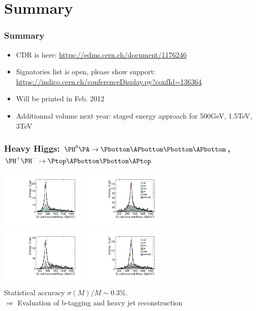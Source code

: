 \documentclass{beamer}
\begin{document}
\section{Summary}
\begin{frame}
\frametitle{Summary}
\begin{itemize}
  \item CDR is here:  \url{https://edms.cern.ch/document/1176246}
  \item Signatories list is open, please show support:
  \url{https://indico.cern.ch/conferenceDisplay.py?confId=136364}
  \item Will be printed in Feb. 2012
  \item Additionnal volume next year: staged energy approach for 500GeV, 1.5TeV, 3TeV
\end{itemize}
\end{frame}

\appendix


\begin{frame}
\frametitle{Heavy Higgs: $\PH^0\PA\to\Pbottom\APbottom\Pbottom\APbottom$,
$\PH^+\PH^-\to\Ptop\APbottom\Pbottom\APtop$}
\centering
\includegraphics[width=4cm]{HAMass742_Bkg_CKFM_00BX_FJ.pdf}
\includegraphics[width=4cm]{HAMass902_Bkg_CKFM_00BX_FJ.pdf}\\
\includegraphics[width=4cm]{Hpm_Mass742_Bkg_CKFM_00BX_FJ.pdf}
\includegraphics[width=4cm]{Hpm_Mass902_Bkg_CKFM_00BX_FJ.pdf}\\
{\scriptsize Statistical accuracy $\sigma(M)/M \sim0.3\%$.}\\
$\Rightarrow$ Evaluation of b-tagging and heavy jet reconstruction
\end{frame}
\end{document}
